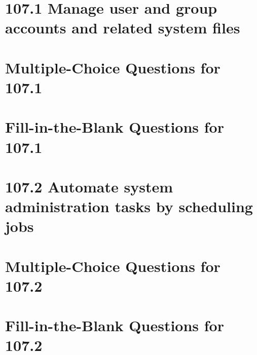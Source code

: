 \documentclass[a4paper]{report}
\begin{document}
\newpage
\section*{107.1 Manage user and group accounts and related system files}

\newpage
\section*{Multiple-Choice Questions for 107.1}

\newpage
\section*{Fill-in-the-Blank Questions for 107.1}

\newpage
\section*{107.2 Automate system administration tasks by scheduling jobs}

\newpage
\section*{Multiple-Choice Questions for 107.2}

\newpage
\section*{Fill-in-the-Blank Questions for 107.2}
\end{document}
